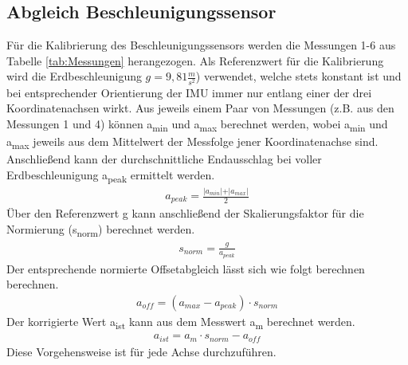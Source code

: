 \subsection{Abgleich Beschleunigungssensor}
Für die Kalibrierung des Beschleunigungssensors werden die Messungen 1-6 aus Tabelle \ref{tab:Messungen} herangezogen. Als Referenzwert für die Kalibrierung wird die Erdbeschleunigung $g=9,81\frac{m}{s^2}$) verwendet, welche stets konstant ist und bei entsprechender Orientierung der IMU immer nur entlang einer der drei Koordinatenachsen wirkt. Aus jeweils einem Paar von Messungen (z.B. aus den Messungen 1 und 4) können a\textsubscript{min} und a\textsubscript{max} berechnet werden, wobei a\textsubscript{min} und a\textsubscript{max} jeweils aus dem Mittelwert der Messfolge jener Koordinatenachse sind. Anschließend kann der durchschnittliche Endausschlag bei voller Erdbeschleunigung a\textsubscript{peak} ermittelt werden.
\begin{align}
	a_{peak}=\frac{\vert{a_{min}}\vert+\vert{a_{max}}\vert}{2}
	\label{eq: a_peak}
\end{align}
Über den Referenzwert g kann anschließend der Skalierungsfaktor für die Normierung (s\textsubscript{norm}) berechnet werden.
\begin{align}
	s_{norm}=\frac{g}{a_{peak}}
	\label{eq: s_norm}
\end{align}
Der entsprechende normierte Offsetabgleich lässt sich wie folgt berechnen berechnen.
\begin{align}
	a_{off}=(a_{max}-a_{peak})\cdot{s_{norm}}
	\label{eq: a_off}
\end{align}
Der korrigierte Wert a\textsubscript{ist} kann aus dem Messwert a\textsubscript{m} berechnet werden.
\begin{align}
	a_{ist}=a_m\cdot{s_{norm}}-a_{off}
	\label{eq: a_ist}
\end{align}
Diese Vorgehensweise ist für jede Achse durchzuführen.

